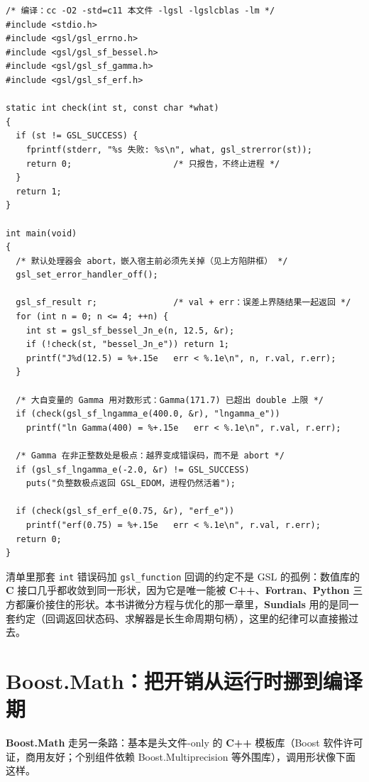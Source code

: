 \documentclass[12pt,a4paper,fontset=fandol]{ctexbook}
\newcommand{\Tp}[1]{\texttt{#1}}
\newcommand{\Lib}[1]{\textbf{#1}}
\newcommand{\Lang}[1]{\textsf{\bfseries #1}}
\newcommand{\CL}{\Lang{C}}
\newcommand{\CPP}{\Lang{C++}}
\newcommand{\FTN}{\Lang{Fortran}}
\newcommand{\PY}{\Lang{Python}}
\begin{document}
\begin{lstlisting}[style=cstyle,caption={\Lib{GSL} 求柱贝塞尔函数：关掉默认 abort，连误差上界一起取},label={lst:ch06-gsl}]
/* 编译：cc -O2 -std=c11 本文件 -lgsl -lgslcblas -lm */
#include <stdio.h>
#include <gsl/gsl_errno.h>
#include <gsl/gsl_sf_bessel.h>
#include <gsl/gsl_sf_gamma.h>
#include <gsl/gsl_sf_erf.h>

static int check(int st, const char *what)
{
  if (st != GSL_SUCCESS) {
    fprintf(stderr, "%s 失败: %s\n", what, gsl_strerror(st));
    return 0;                    /* 只报告，不终止进程 */
  }
  return 1;
}

int main(void)
{
  /* 默认处理器会 abort，嵌入宿主前必须先关掉（见上方陷阱框） */
  gsl_set_error_handler_off();

  gsl_sf_result r;               /* val + err：误差上界随结果一起返回 */
  for (int n = 0; n <= 4; ++n) {
    int st = gsl_sf_bessel_Jn_e(n, 12.5, &r);
    if (!check(st, "bessel_Jn_e")) return 1;
    printf("J%d(12.5) = %+.15e   err < %.1e\n", n, r.val, r.err);
  }

  /* 大自变量的 Gamma 用对数形式：Gamma(171.7) 已超出 double 上限 */
  if (check(gsl_sf_lngamma_e(400.0, &r), "lngamma_e"))
    printf("ln Gamma(400) = %+.15e   err < %.1e\n", r.val, r.err);

  /* Gamma 在非正整数处是极点：越界变成错误码，而不是 abort */
  if (gsl_sf_lngamma_e(-2.0, &r) != GSL_SUCCESS)
    puts("负整数极点返回 GSL_EDOM，进程仍然活着");

  if (check(gsl_sf_erf_e(0.75, &r), "erf_e"))
    printf("erf(0.75) = %+.15e   err < %.1e\n", r.val, r.err);
  return 0;
}
\end{lstlisting}

清单里那套 \Tp{int} 错误码加 \Tp{gsl\_function} 回调的约定不是 GSL 的孤例：数值库的 \CL{} 接口几乎都收敛到同一形状，因为它是唯一能被 \CPP{}、\FTN{}、\PY{} 三方都廉价接住的形状。本书讲微分方程与优化的那一章里，\Lib{Sundials} 用的是同一套约定（回调返回状态码、求解器是长生命周期句柄），这里的纪律可以直接搬过去。

\section{\Lib{Boost.Math}：把开销从运行时挪到编译期}

\Lib{Boost.Math} 走另一条路：基本是头文件-only 的 \CPP{} 模板库（Boost 软件许可证，商用友好；个别组件依赖 Boost.Multiprecision 等外围库），调用形状像下面这样。
\end{document}
